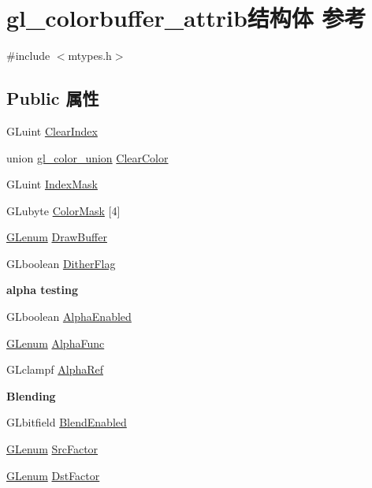 \hypertarget{structgl__colorbuffer__attrib}{}\section{gl\+\_\+colorbuffer\+\_\+attrib结构体 参考}
\label{structgl__colorbuffer__attrib}


{\ttfamily \#include $<$mtypes.\+h$>$}

\subsection*{Public 属性}
\begin{DoxyCompactItemize}
\item 
G\+Luint \hyperlink{structgl__colorbuffer__attrib_a049d8b921c03e19970162547f0001a80}{Clear\+Index}
\item 
union \hyperlink{uniongl__color__union}{gl\+\_\+color\+\_\+union} \hyperlink{structgl__colorbuffer__attrib_ad5e6e80fe1397bed90785951293ddc23}{Clear\+Color}
\item 
G\+Luint \hyperlink{structgl__colorbuffer__attrib_a4e574214f11f4c0b7810d42369eae9cb}{Index\+Mask}
\item 
G\+Lubyte \hyperlink{structgl__colorbuffer__attrib_a9e6af968def517a64fe7573d7fd87b0f}{Color\+Mask} \mbox{[}4\mbox{]}
\item 
\hyperlink{interfacevoid}{G\+Lenum} \hyperlink{structgl__colorbuffer__attrib_ac42792281aa86a925c55509ac66f1941}{Draw\+Buffer}
\item 
G\+Lboolean \hyperlink{structgl__colorbuffer__attrib_a49877603dbd3140a6301f847c942e45f}{Dither\+Flag}
\end{DoxyCompactItemize}
\begin{Indent}\textbf{ alpha testing}\par
\begin{DoxyCompactItemize}
\item 
G\+Lboolean \hyperlink{structgl__colorbuffer__attrib_a3912ae69e5b16c19eb7b3e5eb66afd08}{Alpha\+Enabled}
\item 
\hyperlink{interfacevoid}{G\+Lenum} \hyperlink{structgl__colorbuffer__attrib_a6781432179ca9ec93aab72bc95f780f1}{Alpha\+Func}
\item 
G\+Lclampf \hyperlink{structgl__colorbuffer__attrib_ae9321519a8be3a9c4c428818f2515ad4}{Alpha\+Ref}
\end{DoxyCompactItemize}
\end{Indent}
\begin{Indent}\textbf{ Blending}\par
\begin{DoxyCompactItemize}
\item 
G\+Lbitfield \hyperlink{structgl__colorbuffer__attrib_acfb2864f383415b7104a4d5ce525eef4}{Blend\+Enabled}
\item 
\hyperlink{interfacevoid}{G\+Lenum} \hyperlink{structgl__colorbuffer__attrib_a2856dce578f15a1c3b72320e1ef45104}{Src\+Factor}
\item 
\hyperlink{interfacevoid}{G\+Lenum} \hyperlink{structgl__colorbuffer__attrib_a68453addbfdea27f263aab84ffbf2f19}{Dst\+Factor}
\end{DoxyCompactItemize}
\end{Indent}
